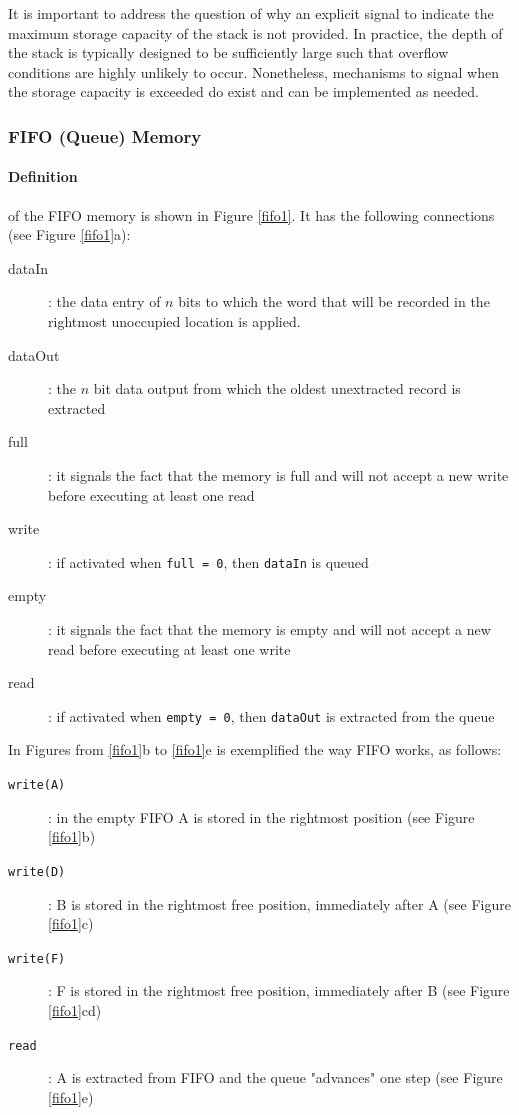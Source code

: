 It is important to address the question of why an explicit signal to indicate the maximum storage capacity of the stack is not provided. In practice, the depth of the stack is typically designed to be sufficiently large such that overflow conditions are highly unlikely to occur. Nonetheless, mechanisms to signal when the storage capacity is exceeded do exist and can be implemented as needed.

\subsubsection{FIFO (Queue) Memory}\label{lb:fifo}

\paragraph{Definition} of the FIFO memory is shown in Figure \ref{fifo1}. It has the following connections (see Figure \ref{fifo1}a):
\begin{description}
    \item[dataIn]: the data entry of $n$ bits to which the word that will be recorded in the rightmost unoccupied location is applied.
    \item[dataOut]: the $n$ bit data output from which the oldest unextracted record is extracted
    \item[full]: it signals the fact that the memory is full and will not accept a new write before executing at least one read
    
    \item[write]: if activated when {\tt full = 0}, then {\tt dataIn} is queued
    \item[empty]: it signals the fact that the memory is empty and will not accept a new read before executing at least one write
    \item[read]: if activated when {\tt empty = 0}, then {\tt dataOut} is extracted from the  queue
\end{description}

In Figures from \ref{fifo1}b to \ref{fifo1}e is exemplified the way FIFO works, as follows:
\begin{description}
    \item[{\tt write(A)}]: in the empty FIFO A is stored in the rightmost position (see Figure \ref{fifo1}b)
    \item[{\tt write(D)}]: B is stored in the rightmost free position, immediately after A (see Figure \ref{fifo1}c)
    \item[{\tt write(F)}]: F is stored in the rightmost free position, immediately after B (see Figure \ref{fifo1}cd)
    \item[{\tt read}]: A is extracted from FIFO and the queue "advances" one step (see Figure \ref{fifo1}e)
\end{description}

